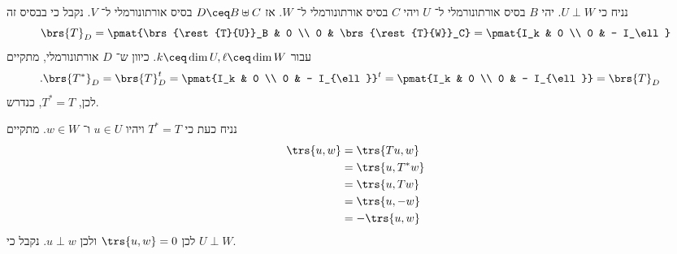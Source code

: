 \documentclass[a4paper,10pt,twoside,openany]{book}
\begin{document}
\begin{solution}
נניח כי
$U \perp W$.
יהי
$B$
בסיס אורתונורמלי ל־%
$U$
ויהי
$C$
בסיס אורתונורמלי ל־%
$W$.
אז
$D \ceq B \uplus C$
בסיס אורתונורמלי ל־%
$V$.
נקבל כי בבסיס זה
\[\brs{T}_D = \pmat{\brs{\rest{T}{U}}_B & 0 \\ 0 & \brs{\rest{T}{W}}_C} = \pmat{I_k & 0 \\ 0 & - I_\ell}\]
עבור
$k \ceq \dim U, \ell \ceq \dim W$.
כיוון ש־%
$D$
אורתונורמלי, מתקיים
\begin{align*}
\text{.} \brs{T^*}_D &= \brs{T}_D^t = \pmat{I_k & 0 \\ 0 & - I_{\ell}}^t = \pmat{I_k & 0 \\ 0 & - I_{\ell}} = \brs{T}_D
\end{align*}
לכן,
$T^* = T$,
כנדרש.

נניח כעת כי
$T^* = T$
ויהיו
$u \in U$
ו־%
$w \in W$.
מתקיים
\begin{align*}
\trs{u,w} &= \trs{Tu, w}
\\&= \trs{u, T^*  w}
\\&= \trs{u, T w}
\\&= \trs{u, -w}
\\&= -\trs{u,w}
\end{align*}
לכן
$\trs{u,w} = 0$
ולכן
$u \perp w$.
נקבל כי
$U \perp W$.
\end{solution}

\printbibliography
\end{document}
